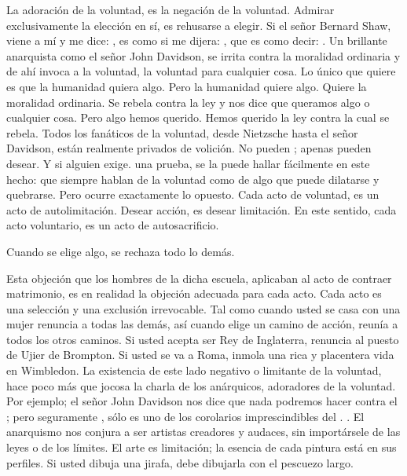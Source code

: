 La adoración de la voluntad, es la negación de la voluntad. Admirar exclusivamente la elección en
sí, es rehusarse a elegir. Si el señor Bernard Shaw, viene a mí y me dice: , es como si me
dijera: , que es como decir: . Un brillante anarquista como el señor John Davidson, se irrita
contra la moralidad ordinaria y de ahí invoca a la voluntad, la voluntad para cualquier cosa. Lo único que
quiere es que la humanidad quiera algo. Pero la humanidad quiere algo. Quiere la moralidad ordinaria. Se
rebela contra la ley y nos dice que queramos algo o cualquier cosa. Pero algo hemos querido. Hemos
querido la ley contra la cual se rebela. Todos los fanáticos de la voluntad, desde Nietzsche hasta el señor
Davidson, están realmente privados de volición. No pueden ; apenas pueden desear. Y si alguien
exige. una prueba, se la puede hallar fácilmente en este hecho: que siempre hablan de la voluntad como
de algo que puede dilatarse y quebrarse. Pero ocurre exactamente lo opuesto. Cada acto de voluntad, es
un acto de autolimitación. Desear acción, es desear limitación. En este sentido, cada acto voluntario, es un
acto de autosacrificio.

Cuando se elige algo, se rechaza todo lo demás.

Esta objeción que los hombres de la dicha escuela, aplicaban al acto de contraer matrimonio, es en
realidad la objeción adecuada para cada acto. Cada acto es una selección y una exclusión irrevocable. Tal
como cuando usted se casa con una mujer renuncia a todas las demás, así cuando elige un camino de
acción, reunía a todos los otros caminos. Si usted acepta ser Rey de Inglaterra, renuncia al puesto de
Ujier de Brompton. Si usted se va a Roma, inmola una rica y placentera vida en Wimbledon. La
existencia de este lado negativo o limitante de la voluntad, hace poco más que jocosa la charla de los
anárquicos, adoradores de la voluntad. Por ejemplo; el señor John Davidson nos dice que nada podremos
hacer contra el ; pero seguramente , sólo es uno de los corolarios
imprescindibles del . . El anarquismo nos conjura a ser artistas creadores y audaces, sin importársele de las leyes o
de los límites. El arte es limitación; la esencia de cada pintura está en sus perfiles. Si usted dibuja una
jirafa, debe dibujarla con el pescuezo largo.

